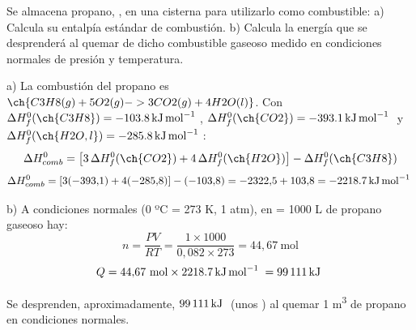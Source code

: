 \begin{exercise}
    Se almacena propano, , en una cisterna para utilizarlo como combustible:
    a) Calcula su entalpía estándar de combustión.
    b) Calcula la energía que se desprenderá al quemar  de dicho combustible gaseoso
    medido en condiciones normales de presión y temperatura.


    \begin{solu}


        a) La combustión del propano es \(\ch{C3H8 (g) + 5 O2 (g) -> 3 CO2 (g) + 4 H2O (l)}\). Con \(\Delta H^0_f (\ch{C3H8}) = \energia[kjmol]{-103,8}\), \(\Delta H^0_f (\ch{CO2}) = \energia[kjmol]{-393,1}\) y \(\Delta H^0_f (\ch{H2O, l}) = \energia[kjmol]{-285,8}\):
        \[
            \Delta H^0_{comb} = \left[3\,\Delta H^0_f(\ch{CO2}) + 4\,\Delta H^0_f(\ch{H2O})\right] - \Delta H^0_f(\ch{C3H8})
        \]
        \[
            \Delta H^0_{comb} = \left[3(-393{,}1)+4(-285{,}8)\right] - (-103{,}8) = -2322{,}5 + 103{,}8 = \energia[kjmol]{-2218,7}
        \]

        b) A condiciones normales (0 ºC = 273 K, 1 atm), en  = 1000 L de propano gaseoso hay:
        \[
            n = \frac{PV}{RT} = \frac{1 \times 1000}{0{,}082 \times 273} = 44{,}67\ \text{mol}
        \]
        \[
            Q = 44{,}67\ \text{mol} \times \energia[kjmol]{2218,7} = \energia[kj]{99111}
        \]

        Se desprenden, aproximadamente, \(\energia[kj]{99111}\) (unos ) al quemar 1 \si{\cubic\metre} de propano en condiciones normales.
    \end{solu}
\end{exercise}
